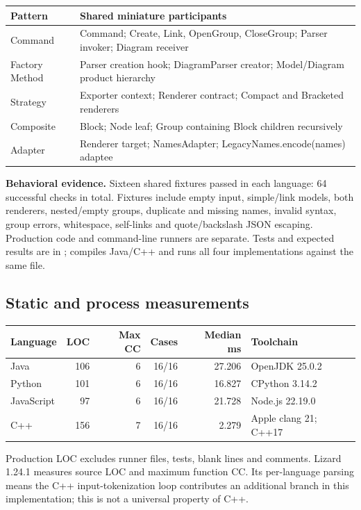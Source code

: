 \documentclass[11pt,a4paper]{article}
\begin{document}
\begin{tabularx}{\linewidth}{@{}lX@{}}\toprule
Pattern & Shared miniature participants\\\midrule
Command & Command; Create, Link, OpenGroup, CloseGroup; Parser invoker; Diagram receiver\\
Factory Method & Parser creation hook; DiagramParser creator; Model/Diagram product hierarchy\\
Strategy & Exporter context; Renderer contract; Compact and Bracketed renderers\\
Composite & Block; Node leaf; Group containing Block children recursively\\
Adapter & Renderer target; NamesAdapter; LegacyNames.encode(names) adaptee\\\bottomrule
\end{tabularx}

\textbf{Behavioral evidence.} Sixteen shared fixtures passed in each language:
64 successful checks in total. Fixtures include empty input, simple/link models,
both renderers, nested/empty groups, duplicate and missing names, invalid syntax,
group errors, whitespace, self-links and quote/backslash JSON escaping. Production
code and command-line runners are separate. Tests and expected results are in
;  compiles Java/C++
and runs all four implementations against the same file.

\subsection{Static and process measurements}
\begin{tabularx}{\linewidth}{@{}lrrrrX@{}}\toprule
Language & LOC & Max CC & Cases & Median ms & Toolchain\\\midrule
Java & 106 & 6 & 16/16 & 27.206 & OpenJDK 25.0.2\\
Python & 101 & 6 & 16/16 & 16.827 & CPython 3.14.2\\
JavaScript & 97 & 6 & 16/16 & 21.728 & Node.js 22.19.0\\
C++ & 156 & 7 & 16/16 & 2.279 & Apple clang 21; C++17\\
\bottomrule\end{tabularx}

Production LOC excludes runner files, tests, blank lines and comments. Lizard
1.24.1 measures source LOC and maximum function CC. Its per-language parsing
means the C++ input-tokenization loop contributes an additional branch in this
implementation; this is not a universal property of C++.
\end{document}
